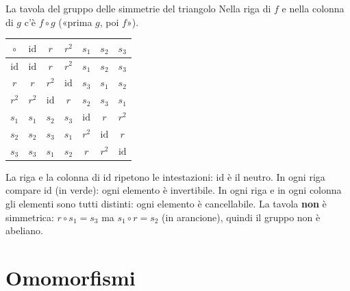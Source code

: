 \begin{esempio}{La tavola del gruppo delle simmetrie del triangolo}
    \label{es:tavola-triangolo}
    Nella riga di $f$ e nella colonna di $g$ c'è $f \circ g$ («prima $g$, poi $f$»).
    \begin{center}
    \renewcommand{\arraystretch}{1.25}
    \begin{tabular}{c|cccccc}
        $\circ$ & $\mathrm{id}$ & $r$ & $r^2$ & $s_1$ & $s_2$ & $s_3$ \\ \hline
        $\mathrm{id}$ & $\mathrm{id}$ & $r$ & $r^2$ & $s_1$ & $s_2$ & $s_3$ \\
        $r$ & $r$ & $r^2$ & \cellcolor{seagreen!20}$\mathrm{id}$ & \cellcolor{orange!30}$s_3$ & $s_1$ & $s_2$ \\
        $r^2$ & $r^2$ & \cellcolor{seagreen!20}$\mathrm{id}$ & $r$ & $s_2$ & $s_3$ & $s_1$ \\
        $s_1$ & $s_1$ & \cellcolor{orange!30}$s_2$ & $s_3$ & \cellcolor{seagreen!20}$\mathrm{id}$ & $r$ & $r^2$ \\
        $s_2$ & $s_2$ & $s_3$ & $s_1$ & $r^2$ & \cellcolor{seagreen!20}$\mathrm{id}$ & $r$ \\
        $s_3$ & $s_3$ & $s_1$ & $s_2$ & $r$ & $r^2$ & \cellcolor{seagreen!20}$\mathrm{id}$ \\
    \end{tabular}
    \end{center}
    La riga e la colonna di $\mathrm{id}$ ripetono le intestazioni: $\mathrm{id}$ è il neutro. In ogni riga compare $\mathrm{id}$ (in verde): ogni elemento è invertibile.
    In ogni riga e in ogni colonna gli elementi sono tutti distinti: ogni elemento è cancellabile. La tavola \textbf{non} è simmetrica: $r \circ s_1 = s_3$ ma
    $s_1 \circ r = s_2$ (in arancione), quindi il gruppo non è abeliano.
\end{esempio}

\section{Omomorfismi}\label{sec:omomorfismi}


